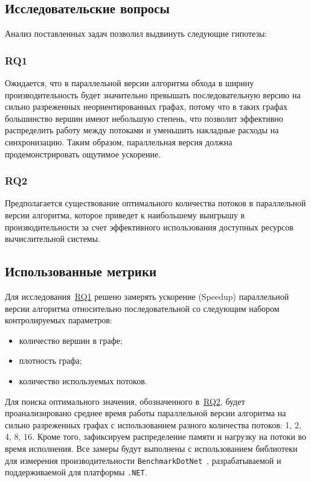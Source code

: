 \subsection{Исследовательские вопросы}
Анализ поставленных задач позволил выдвинуть следующие гипотезы:
{\parindent0pt
    
    \subsubsection*{RQ1}
    \label{RQ1}
    Ожидается, что в параллельной версии алгоритма обхода в ширину производительность будет значительно превышать последовательную версию на сильно разреженных неориентированных графах, потому что в таких графах большинство вершин имеют небольшую степень, что позволит эффективно распределить работу между потоками и уменьшить накладные расходы на синхронизацию. Таким образом, параллельная версия должна продемонстрировать ощутимое ускорение.
}
{\parindent0pt
    \subsubsection*{RQ2}
    \label{RQ2}
    Предполагается существование оптимального количества потоков в параллельной версии алгоритма, которое приведет к наибольшему выигрышу в производительности за счет эффективного использования доступных ресурсов вычислительной системы.
}

\subsection{Использованные метрики}

Для исследования~\hyperref[RQ1]{RQ1} решено замерять ускорение (Speedup) параллельной версии алгоритма относительно последовательной со следующим набором контролируемых параметров:
\begin{itemize}
    \item количество вершин в графе;
    \item плотность графа;
    \item количество используемых потоков.
\end{itemize}

Для поиска оптимального значения, обозначенного в~\hyperref[RQ2]{RQ2}, будет проанализировано среднее время работы параллельной версии алгоритма на сильно разреженных графах с использованием разного количества потоков: 1, 2, 4, 8, 16. 
Кроме того, зафиксируем распределение памяти и нагрузку на потоки во время исполнения.
Все замеры будут выполнены с использованием библиотеки для измерения производительности \texttt{BenchmarkDotNet}~\cite{benchTool}, разрабатываемой и поддерживаемой для платформы \texttt{.NET}.

